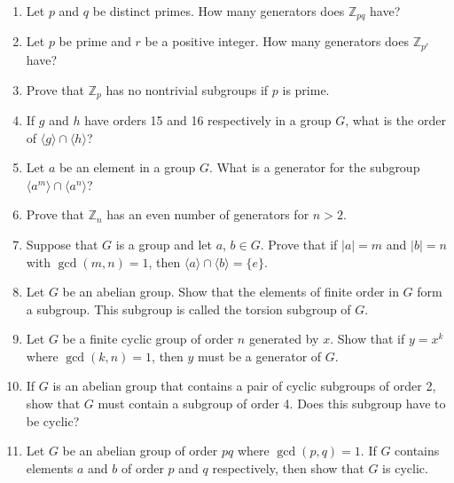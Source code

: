 {\begin{enumerate}
\begin{enumerate}
 \item
The order of $ab$ is the same as the order of $ba$.
 
\end{enumerate}
 
 
\item
Let $p$ and $q$ be distinct primes.  How many generators does ${\mathbb
Z}_{pq}$ have? 
 
 
\item
Let $p$ be prime and $r$ be a positive integer.  How many generators
does ${\mathbb Z}_{p^r}$ have? 
 
 
\item
Prove that  ${\mathbb Z}_{p}$ has no nontrivial subgroups if $p$ is
prime. 
 
 
\item
If $g$ and $h$ have orders 15 and 16 respectively in a group $G$, what
is the order of $\langle g \rangle  \cap \langle h \rangle $? 
 
 
\item
Let $a$ be an element in a group $G$. What is a generator for the
subgroup $\langle a^m \rangle  \cap  \langle a^n \rangle $?
 
 
\item
Prove that ${\mathbb Z}_n$ has an even number of generators for $n>2$. 
 
 
\item
Suppose that $G$ is a group and let $a$, $b \in G$. Prove that if $|a|
= m$ and $|b| = n$ with $\gcd(m,n) = 1$, then $\langle a \rangle  \cap
\langle b \rangle  = \{ e \}$. 
 
 
\item
Let $G$ be an abelian group. Show that the elements of finite order in
$G$ form a subgroup. This subgroup is called the {\bfi torsion
subgroup} of $G$. 
 
 
\item
Let $G$ be a finite cyclic group of order $n$ generated by $x$. Show
that if $y = x^k$ where $\gcd(k,n) = 1$, then $y$ must be a generator
of $G$.
 
 
\item
If $G$ is an abelian group that contains a pair of cyclic subgroups of
order 2, show that $G$ must contain a subgroup of order 4. Does this
subgroup have to be cyclic?
 
 
\item
Let $G$ be an abelian group of order $pq$ where $\gcd(p,q) = 1$.  If
$G$ contains elements $a$ and $b$ of order $p$ and $q$ respectively,
then show that $G$ is cyclic. 
 

\end{enumerate}}
